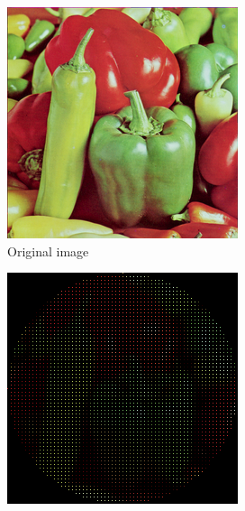 \begin{figure}
    \begin{subfigure}{.49\textwidth}
        \centering
    \includegraphics[width=\textwidth]{figures/pepper_color_256.png}
    \caption{Original image}
    \end{subfigure}
    \begin{subfigure}{.49\textwidth}
        \centering
    \includegraphics[width=\textwidth]{figures/pepper_square.png}

\end{subfigure}
\end{figure}
